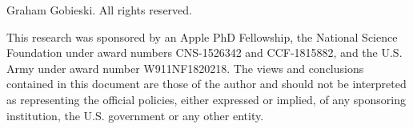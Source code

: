 \documentclass[
11pt, %
english, %
singlespacing, %
headsepline, %
]{thesis} %
\begin{document}
\begin{titlepage}
\begin{center}
\vfill
\large{ Graham Gobieski. All rights reserved.}

\vspace{1em}

This research was sponsored by an Apple PhD Fellowship, the National Science Foundation under award numbers CNS-1526342 and CCF-1815882, and the U.S. Army under award number W911NF1820218.  The views and conclusions contained in this document are those of the author and should not be interpreted as representing the official policies, either expressed or implied, of any sponsoring institution, the U.S. government or any other entity.

\vfill
\end{center}
\end{titlepage}



 
\end{document}
